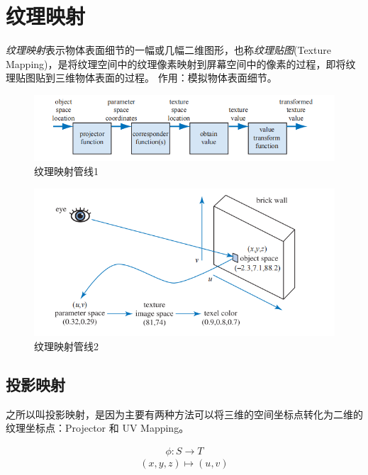 \chapter{纹理映射}

\textsl{纹理映射}表示物体表面细节的一幅或几幅二维图形，也称\textsl{纹理贴图}(Texture Mapping)，是将纹理空间中的纹理像素映射到屏幕空间中的像素的过程，即将纹理贴图贴到三维物体表面的过程。
作用：模拟物体表面细节。

\begin{figure}[H]
    \centering
    \includegraphics[scale=0.6]{figures/纹理映射的pipepine.png}
    \caption{纹理映射管线1}
\end{figure}

\begin{figure}[H]
    \centering
    \includegraphics[scale=0.6]{figures/纹理渲染管线2.png}
    \caption{纹理映射管线2}
\end{figure}

\section{投影映射}

之所以叫投影映射，是因为主要有两种方法可以将三维的空间坐标点转化为二维的纹理坐标点：Projector 和 UV Mapping。

\begin{eqnarray}
    \phi:S\rightarrow T
\end{eqnarray}
\begin{equation}
    (x,y,z)\mapsto (u,v)
    \nonumber
\end{equation}

